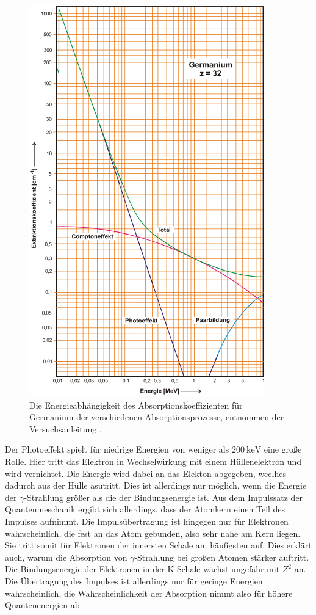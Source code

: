 \begin{figure}
  \centering
  \includegraphics[scale=0.7]{pictures/Gammaabsorption.png}
  \caption{Die Energieabhängigkeit des Absorptionskoeffizienten für Germanium der verschiedenen Absorptionsprozesse, entnommen der Versuchsanleitung \cite[236]{sample}.}
  \label{fig:Gammaabsorption}
\end{figure}

Der Photoeffekt spielt für niedrige Energien von weniger als $\SI{200}{\kilo\electronvolt}$ eine große Rolle.
Hier tritt das Elektron in Wechselwirkung mit einem Hüllenelektron und wird vernichtet.
Die Energie wird dabei an das Elekton abgegeben, weclhes dadurch aus der Hülle asutritt.
Dies ist allerdings nur möglich, wenn die Energie der $\gamma$-Strahlung größer als die der Bindungsenergie ist.
Aus dem Impulssatz der Quantenmeschanik ergibt sich allerdings, dass der Atomkern einen Teil des Impulses aufnimmt.
Die Impulsübertragung ist hingegen nur für Elektronen wahrscheinlich, die fest an das Atom gebunden, also sehr nahe am Kern liegen.
Sie tritt somit für Elektronen der innersten Schale am häufigsten auf.
Dies erklärt auch, warum die Absorption von $\gamma$-Strahlung bei großen Atomen stärker auftritt.
Die Bindungsenergie der Elektronen in der K-Schale wächst ungefähr mit $Z^2$ an.
Die Übertragung des Impulses ist allerdings nur für geringe Energien wahrscheinlich, die Wahrscheinlichkeit der Absorption nimmt also für höhere Quantenenergien ab.


